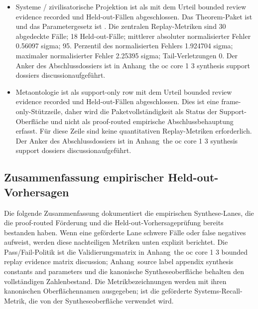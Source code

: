 \begin{itemize}[leftmargin=1.6em,nosep]
\item Systeme / zivilisatorische Projektion ist als  mit dem Urteil bounded review evidence recorded und  Held-out-Fällen abgeschlossen. Das Theorem-Paket ist  und das Parametergesetz ist . Die zentralen Replay-Metriken sind 30 abgedeckte Fälle; 18 Held-out-Fälle; mittlerer absoluter normalisierter Fehler 0.56097 sigma; 95. Perzentil des normalisierten Fehlers 1.924704 sigma; maximaler normalisierter Fehler 2.25395 sigma; Tail-Verletzungen 0. Der Anker des Abschlussdossiers ist in Anhang~the oc core 1 3 synthesis support dossiers discussionaufgeführt.
\item Metaontologie ist als support-only row mit dem Urteil bounded review evidence recorded und  Held-out-Fällen abgeschlossen. Dies ist eine frame-only-Stützzeile, daher wird die Paketvollständigkeit als Status der Support-Oberfläche und nicht als proof-routed empirische Abschlussbehauptung erfasst. Für diese Zeile sind keine quantitativen Replay-Metriken erforderlich. Der Anker des Abschlussdossiers ist in Anhang~the oc core 1 3 synthesis support dossiers discussionaufgeführt.
\end{itemize}

\subsection{Zusammenfassung empirischer Held-out-Vorhersagen}
Die folgende Zusammenfassung dokumentiert die empirischen Synthese-Lanes, die die proof-routed Förderung und die Held-out-Vorhersageprüfung bereits bestanden haben.
Wenn eine geförderte Lane schwere Fälle oder false negatives aufweist, werden diese nachteiligen Metriken unten explizit berichtet. Die Pass/Fail-Politik ist die Validierungsmatrix in Anhang~the oc core 1 3 bounded replay evidence matrix discussion; Anhang~source label appendix synthesis constants and parameters und die kanonische Syntheseoberfläche behalten den vollständigen Zahlenbestand.
Die Metrikbezeichnungen werden mit ihren kanonischen Oberflächennamen ausgegeben;  ist die geförderte Systems-Recall-Metrik, die von der Syntheseoberfläche verwendet wird.

